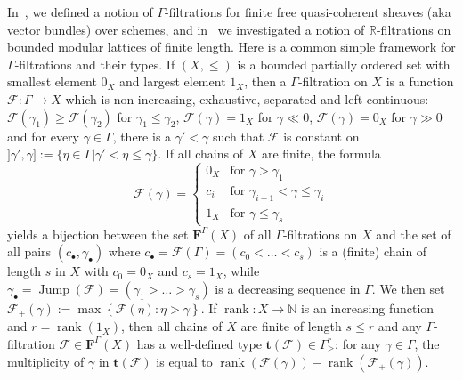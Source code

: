 \documentclass[11pt]{article}
\theoremstyle{definition}
\numberwithin{equation}{section}
\numberwithin{figure}{section}
\numberwithin{table}{section}
\DeclareMathOperator{\rank}{rank}
\DeclareMathOperator{\Jump}{Jump}
\begin{document}
In~\cite{Co14}, we defined a notion of $\Gamma$-filtrations for finite free quasi-coherent sheaves (aka vector bundles) over schemes, and in~\cite{Co16} we investigated a notion of $\mathbb{R}$-filtrations on bounded modular lattices of finite length. Here is a common simple framework for $\Gamma$-filtrations and their types. If $(X,\leq)$ is a bounded partially ordered set with smallest element $0_{X}$ and largest element $1_{X}$, then a $\Gamma$-filtration on $X$ is a function $\mathcal{F}:\Gamma\rightarrow X$ which is non-increasing, exhaustive, separated and left-continuous: $\mathcal{F}(\gamma_{1})\geq\mathcal{F}(\gamma_{2})$ for $\gamma_{1}\leq\gamma_{2}$, $\mathcal{F}(\gamma)=1_{X}$ for $\gamma\ll0$, $\mathcal{F}(\gamma)=0_{X}$ for $\gamma\gg0$ and for every $\gamma\in\Gamma$, there is a $\gamma'<\gamma$ such that $\mathcal{F}$ is constant on $]\gamma',\gamma]:=\{\eta\in\Gamma\vert\gamma'<\eta\leq\gamma\}$. If all chains of $X$ are finite, the formula
\[
\mathcal{F}(\gamma)=
\begin{cases}
0_{X} & \text{for }\gamma>\gamma_{1}\\
c_{i} & \text{for }\gamma_{i+1}<\gamma\leq\gamma_{i}\\
1_{X} & \text{for }\gamma\leq\gamma_{s}
\end{cases}
\]
yields a bijection between the set $\mathbf{F}^{\Gamma}(X)$ of all $\Gamma$-filtrations on $X$ and the set of all pairs $(c_{\bullet},\gamma_{\bullet})$ where $c_{\bullet}=\mathcal{F}(\Gamma)=(c_{0}<\dots<c_{s})$ is a (finite) chain of length $s$ in $X$ with $c_{0}=0_{X}$ and $c_{s}=1_{X}$, while $\gamma_{\bullet}=\Jump(\mathcal{F})=(\gamma_{1}>\dots>\gamma_{s})$ is a decreasing sequence in $\Gamma$. We then set $\mathcal{F}_{+}(\gamma):=\max\left\{ \mathcal{F}(\eta):\eta>\gamma\right\} $. If $\rank:X\rightarrow\mathbb{N}$ is an increasing function and $r=\rank(1_{X})$, then all chains of $X$ are finite of length $s\leq r$ and any $\Gamma$-filtration $\mathcal{F}\in\mathbf{F}^{\Gamma}(X)$ has a well-defined type $\mathbf{t}(\mathcal{F})\in\Gamma_{\geq}^{r}$: for any $\gamma\in\Gamma$, the multiplicity of $\gamma$ in $\mathbf{t}(\mathcal{F})$ is equal to $\rank(\mathcal{F}(\gamma))-\rank(\mathcal{F}_{+}(\gamma))$.
\end{document}
